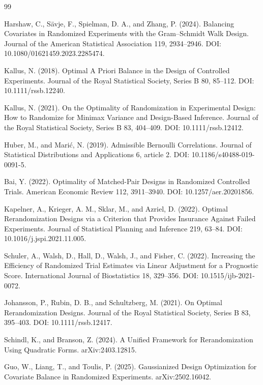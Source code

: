 \documentclass{article}
\begin{document}
\begin{thebibliography}{99}

   Harshaw, C., Sävje, F., Spielman, D. A., and Zhang, P. (2024). Balancing Covariates in Randomized Experiments with the Gram--Schmidt Walk Design. Journal of the American Statistical Association 119, 2934--2946. DOI: 10.1080/01621459.2023.2285474.

   Kallus, N. (2018). Optimal A Priori Balance in the Design of Controlled Experiments. Journal of the Royal Statistical Society, Series B 80, 85--112. DOI: 10.1111/rssb.12240.

   Kallus, N. (2021). On the Optimality of Randomization in Experimental Design: How to Randomize for Minimax Variance and Design-Based Inference. Journal of the Royal Statistical Society, Series B 83, 404--409. DOI: 10.1111/rssb.12412.

   Huber, M., and Marić, N. (2019). Admissible Bernoulli Correlations. Journal of Statistical Distributions and Applications 6, article 2. DOI: 10.1186/s40488-019-0091-5.

   Bai, Y. (2022). Optimality of Matched-Pair Designs in Randomized Controlled Trials. American Economic Review 112, 3911--3940. DOI: 10.1257/aer.20201856.

   Kapelner, A., Krieger, A. M., Sklar, M., and Azriel, D. (2022). Optimal Rerandomization Designs via a Criterion that Provides Insurance Against Failed Experiments. Journal of Statistical Planning and Inference 219, 63--84. DOI: 10.1016/j.jspi.2021.11.005.

   Schuler, A., Walsh, D., Hall, D., Walsh, J., and Fisher, C. (2022). Increasing the Efficiency of Randomized Trial Estimates via Linear Adjustment for a Prognostic Score. International Journal of Biostatistics 18, 329--356. DOI: 10.1515/ijb-2021-0072.

   Johansson, P., Rubin, D. B., and Schultzberg, M. (2021). On Optimal Rerandomization Designs. Journal of the Royal Statistical Society, Series B 83, 395--403. DOI: 10.1111/rssb.12417.

   Schindl, K., and Branson, Z. (2024). A Unified Framework for Rerandomization Using Quadratic Forms. arXiv:2403.12815.

   Guo, W., Liang, T., and Toulis, P. (2025). Gaussianized Design Optimization for Covariate Balance in Randomized Experiments. arXiv:2502.16042.


\end{thebibliography}
\end{document}
